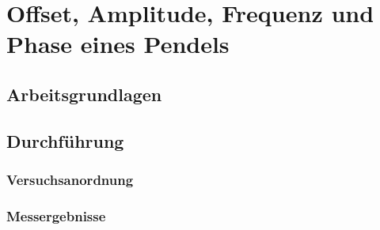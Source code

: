 \section{Offset, Amplitude, Frequenz und Phase eines Pendels}

\subsection{Arbeitsgrundlagen}

\subsection{Durchf\"{u}hrung}

\subsubsection*{Versuchsanordnung}

\subsubsection*{Messergebnisse}

